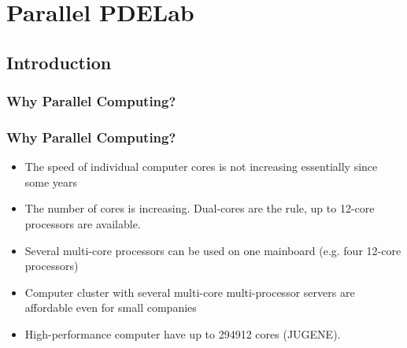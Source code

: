 
\section{Parallel PDELab}
\subsection{Introduction}

\subsubsection{Why Parallel Computing?}

\begin{frame}
\frametitle<presentation>{Why Parallel Computing?}

\begin{itemize}
\item The speed of individual computer cores is not increasing 
essentially since some years
\item The number of cores is increasing. Dual-cores are the rule, 
up to 12-core processors are available.
\item Several multi-core processors can be used on one mainboard (e.g. four 12-core processors)
\item Computer cluster with several multi-core multi-processor servers are affordable even for small companies
\item High-performance computer have up to 294912 cores (JUGENE).
\end{itemize}

\end{frame}

